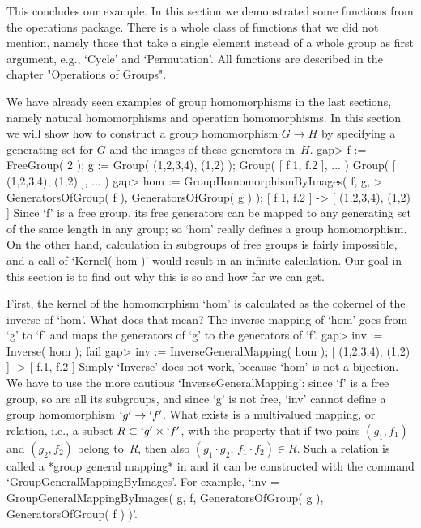 This  concludes  our  example.   In  this  section  we demonstrated  some
functions  from  the operations  package.   There  is  a  whole class  of
functions that  we  did  not mention, namely  those that  take  a  single
element instead  of a  whole  group  as first argument, e.g., `Cycle' and
`Permutation'.  All functions are described in the chapter "Operations of
Groups".


We  have already    seen examples of  group  homomorphisms   in the  last
sections, namely  natural homomorphisms and  operation homomorphisms.  In
this section we will show how to construct  a group homomorphism $G\to H$
by specifying a generating set for $G$ and the images of these generators
in~$H$.
\beginexample
    gap> f := FreeGroup( 2 ); g := Group( (1,2,3,4), (1,2) );
    Group( [ f.1, f.2 ], ... )
    Group( [ (1,2,3,4), (1,2) ], ... )
    gap> hom := GroupHomomorphismByImages( f, g,
    >           GeneratorsOfGroup( f ), GeneratorsOfGroup( g ) );
    [ f.1, f.2 ] -> [ (1,2,3,4), (1,2) ]
\endexample
Since `f'  is a  free  group, its free  generators  can be mapped  to any
generating set of the same length in any group; so `hom' really defines a
group homomorphism.  On the other  hand, calculation in subgroups of free
groups is fairly impossible, and  a call of  `Kernel( hom )' would result
in an infinite calculation. Our goal  in this section is  to find out why
this is so and how far we can get.

First, the kernel of the homomorphism `hom' is calculated as the cokernel
of the inverse  of `hom'. What   does that mean?  The inverse  mapping of
`hom' goes from  `g'  to  `f' and  maps  the  generators  of `g'   to the
generators of `f'.
\beginexample
    gap> inv := Inverse( hom );
    fail
    gap> inv := InverseGeneralMapping( hom );
    [ (1,2,3,4), (1,2) ] -> [ f.1, f.2 ]
\endexample
Simply `Inverse' does not work, because `hom' is not a bijection. We have
to use the more cautious   `InverseGeneralMapping': since `f' is a   free
group, so are all its subgroups, and since  `g' is not free, `inv' cannot
define a group homomorphism  $`g' \to `f'$.  What exists is a multivalued
mapping, or relation, i.e., a subset $R\subset  `g' \times `f'$, with the
property that  if  two pairs $(g_1,f_1)$  and $(g_2,f_2)$  belong to~$R$,
then also $(g_1\cdot g_2,\,f_1\cdot f_2)\in R$. Such a relation is called
a *group general mapping* in  {\GAP} and it  can be constructed with  the
command    `GroupGeneralMappingByImages'.     For   example,   `inv     =
GroupGeneralMappingByImages(    g,      f,    GeneratorsOfGroup(   g   ),
GeneratorsOfGroup( f ) )'.

